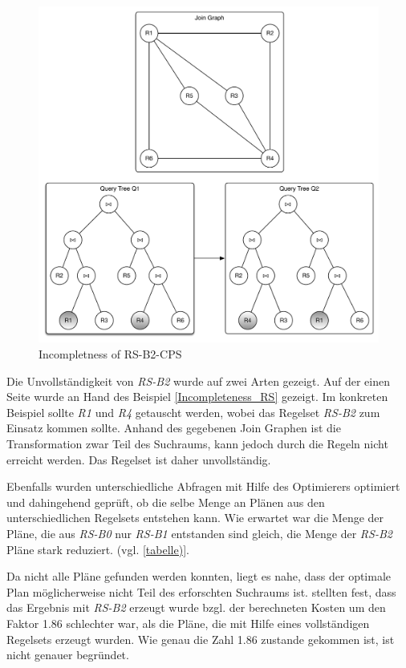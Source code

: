 \begin{figure}[ht]
  \centering
  \includegraphics[width=\textwidth]{02_Related_Work/Graphs.pdf}
  \caption{Incompletness of RS-B2-CPS}
  \label{Incompleteness_RS-B2-CPS}
\end{figure}


Die Unvollständigkeit von \textit{RS-B2} wurde auf zwei Arten gezeigt. Auf der einen Seite wurde an Hand des Beispiel \ref{Incompleteness_RS} gezeigt. Im konkreten Beispiel sollte \textit{R1} und \textit{R4} getauscht werden, wobei das Regelset \textit{RS-B2} zum Einsatz kommen sollte. Anhand des gegebenen Join Graphen ist die Transformation zwar Teil des Suchraums, kann jedoch durch die Regeln nicht erreicht werden. Das Regelset ist daher unvollständig.

Ebenfalls wurden unterschiedliche Abfragen mit Hilfe des Optimierers optimiert und dahingehend geprüft, ob die selbe Menge an Plänen aus den unterschiedlichen Regelsets entstehen kann. Wie erwartet war die Menge der Pläne, die aus \textit{RS-B0} nur \textit{RS-B1} entstanden sind gleich, die Menge der \textit{RS-B2} Pläne stark reduziert. (vgl. \ref{tabelle)}.

Da nicht alle Pläne gefunden werden konnten, liegt es nahe, dass der optimale Plan möglicherweise nicht Teil des erforschten Suchraums ist. \cite{shanbhag2014optimizing} stellten fest, dass das Ergebnis mit \textit{RS-B2} erzeugt wurde bzgl. der berechneten Kosten um den Faktor 1.86 schlechter war, als die Pläne, die mit Hilfe eines vollständigen Regelsets erzeugt wurden. Wie genau die Zahl 1.86 zustande gekommen ist, ist nicht genauer begründet.

